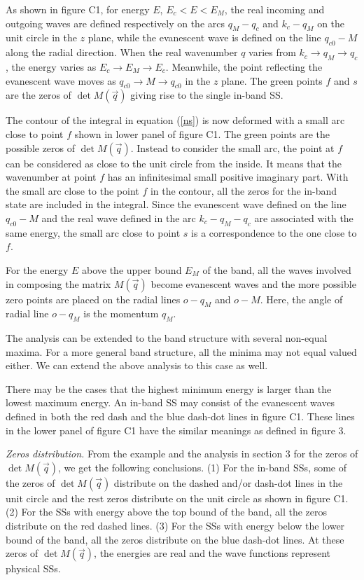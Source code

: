 \documentclass[aps,pra,amsmath,twocolumn,showpacs,bibnotes,10pt]{revtex4-1}
\begin{document}
As shown in figure C1, for energy $E$, $E_c < E < E_M$, the real incoming and outgoing waves are defined respectively on the arcs $q_M-q_c$ and $k_c-q_M$ on the unit circle in the $z$ plane, while the evanescent wave is defined on the line $q_{c0}-M$ along the radial direction. When the real wavenumber $q$ varies from $k_{c} \to q_M \to q_{c}$, the energy varies as $E_c \to E_M \to E_c$. Meanwhile, the point reflecting the evanescent wave moves as $q_{c0} \to M \to q_{c0}$ in the $z$ plane. The green points $f$ and $s$ are the zeros of $\det M(\vec q)$ giving rise to the single in-band SS. 

The contour of the integral in equation (\ref{ns}) is now deformed with a small arc close to point $f$ shown in lower panel of figure C1. The green points are the possible zeros of $\det M(\vec q)$. Instead to consider the small arc, the point at $f$ can be considered as close to the unit circle from the inside. It means that the wavenumber at point $f$ has an infinitesimal small positive imaginary part. With the small arc close to the point $f$ in the contour, all the zeros for the in-band state are included in the integral. Since the evanescent wave defined on the line $q_{c0}-M$ and the real wave defined in the arc $k_c-q_M-q_c$ are associated with the same energy, the small arc close to point $s$ is a correspondence to the one close to $f$. 

For the energy $E$ above the upper bound $E_M$ of the band, all the waves involved in composing the matrix $M(\vec q)$ become evanescent waves and the more possible zero points are placed on the radial lines $o-q_M$ and $o-M$. Here, the angle of radial line $o-q_M$ is the momentum $q_M$.

The analysis can be extended to the band structure with several non-equal maxima. For a more general band structure, all the minima may not equal valued either. We can extend the above analysis to this case as well. 

There may be the cases that the highest minimum energy is larger than the lowest maximum energy. An in-band SS may consist of the evanescent waves defined in both the red dash and the blue dash-dot lines in figure C1. These lines in the lower panel of figure C1 have the similar meanings as defined in figure 3. 

{\it Zeros distribution.} From the example and the analysis in section 3 for the zeros of $\det M(\vec q)$, we get the following conclusions. (1) For the in-band SSs, some of the zeros of $\det M(\vec q)$ distribute on the dashed and/or dash-dot lines in the unit circle and the rest zeros distribute on the unit circle as shown in figure C1. (2) For the SSs with energy above the top bound of the band, all the zeros distribute on the red dashed lines. (3) For the SSs with energy below the lower bound of the band, all the zeros distribute on the blue dash-dot lines. At these zeros of $\det M(\vec q)$, the energies are real and the wave functions represent physical SSs. 
\end{document}
